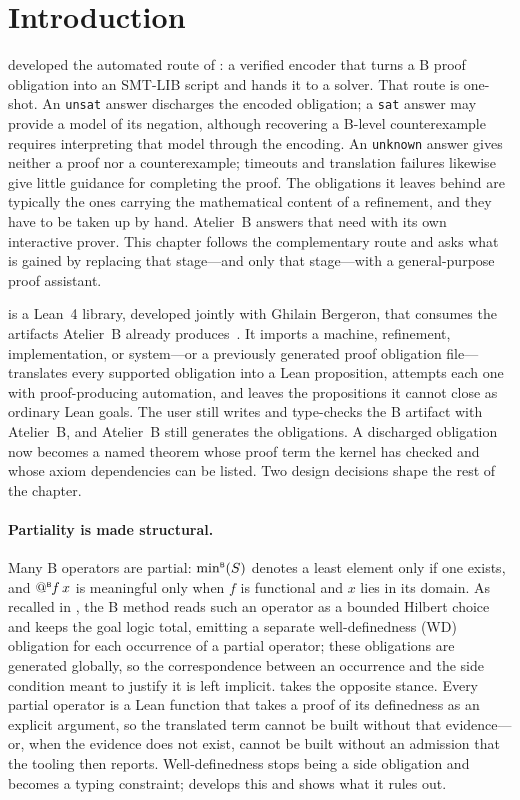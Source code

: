 \section{Introduction}
\label{sec:barrel-introduction}

 developed the automated route of : a
verified encoder that turns a B proof obligation into an SMT-LIB script and hands it to a
solver.
That route is one-shot.
An \texttt{unsat} answer discharges the encoded obligation; a \texttt{sat} answer may
provide a model of its negation, although recovering a B-level counterexample requires
interpreting that model through the encoding.
An \texttt{unknown} answer gives neither a proof nor a counterexample; timeouts and
translation failures likewise give little guidance for completing the proof.
The obligations it leaves behind are typically the ones carrying the mathematical content
of a refinement, and they have to be taken up by hand.
Atelier~B answers that need with its own interactive prover.
This chapter follows the complementary route and asks what is gained by replacing that
stage---and only that stage---with a general-purpose proof assistant.

\barrel{} is a Lean~4 library, developed jointly with Ghilain Bergeron, that consumes the
artifacts Atelier~B already produces~\cite{bergeron2026barrel,bergeron2026barrelAFADL}.
It imports a machine, refinement, implementation, or system---or a previously generated
proof obligation file---translates every supported obligation into a Lean proposition,
attempts each one with proof-producing automation, and leaves the propositions it cannot
close as ordinary Lean goals.
The user still writes and type-checks the B artifact with Atelier~B, and Atelier~B still
generates the obligations.
A discharged obligation now becomes a named theorem whose proof term the kernel has checked
and whose axiom dependencies can be listed.
Two design decisions shape the rest of the chapter.

\paragraph*{Partiality is made structural.}
Many B operators are partial: \(\mathop{{\min}^{\scriptscriptstyle{\mathsf{B}}}}(S)\) denotes a least element only if one exists, and
\(\mathord{@^{\scriptscriptstyle{\mathsf{B}}}\mkern-1mu} f\,x\) is meaningful only when \(f\) is functional and \(x\) lies in its domain.
As recalled in , the B method reads such an operator as a bounded Hilbert
choice and keeps the goal logic total, emitting a separate well-definedness (WD) obligation
for each occurrence of a partial operator; these obligations are generated globally, so the correspondence
between an occurrence and the side condition meant to justify it is left implicit.
\barrel{} takes the opposite stance.
Every partial operator is a Lean function that takes a proof of its definedness as an
explicit argument, so the translated term cannot be built without that evidence---or, when
the evidence does not exist, cannot be built without an admission that the tooling then
reports.
Well-definedness stops being a side obligation and becomes a typing constraint;
 develops this and  shows what it
rules out.

